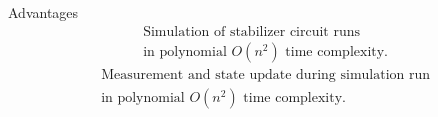 \begin{frame}{Advantages}
    \vspace*{-\dimexpr\baselineskip/2} %
    \[
        \begin{aligned}
            &\text{Simulation of stabilizer circuit runs} \\
            &\text{in polynomial }
            O\left(n^2\right)
            \text{ time complexity.}
        \end{aligned}
    \]
    \vfill
    \[
        \begin{aligned}
            &\text{Measurement and state update during simulation run} \\
            &\text{in polynomial }
            O\left(n^2\right)
            \text{ time complexity.}
        \end{aligned}
    \]
    \vfill
\end{frame}
